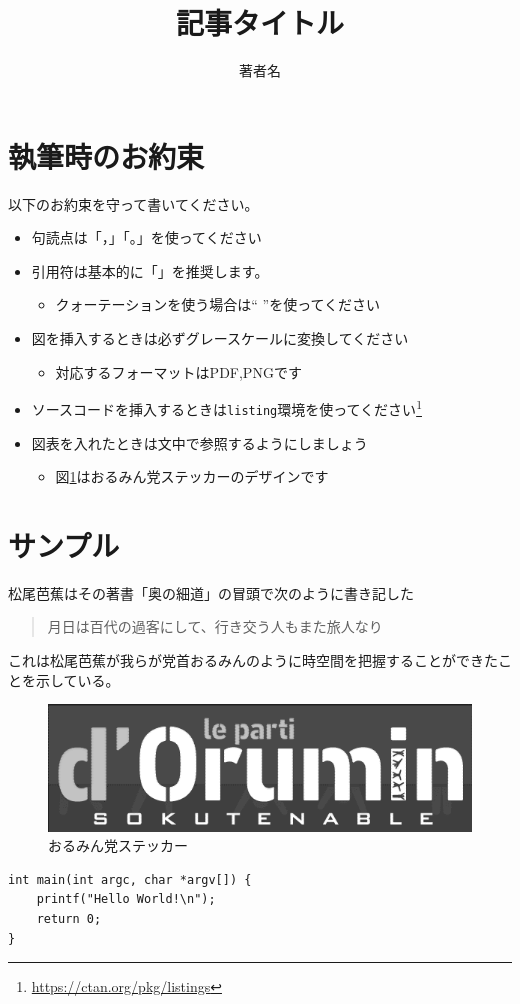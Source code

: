 \documentclass[b5j,papersize,twocolumn]{ltjsarticle}
\title{記事タイトル}
\author{著者名}
\date{}
\begin{document}
\pagestyle{empty}
\maketitle

\section{執筆時のお約束}
以下のお約束を守って書いてください。
\begin{itemize}
	\item 句読点は「，」「。」を使ってください
	\item 引用符は基本的に「」を推奨します。
	\begin{itemize}
		\item クォーテーションを使う場合は`` ''を使ってください
	\end{itemize}
	\item 図を挿入するときは必ずグレースケールに変換してください
	\begin{itemize}
		\item 対応するフォーマットはPDF,PNGです
	\end{itemize}
	\item ソースコードを挿入するときは\verb|listing|環境を使ってください\footnote{\url{https://ctan.org/pkg/listings}}
	\item 図表を入れたときは文中で参照するようにしましょう
	\begin{itemize}
		\item 図\ref{img:sample}はおるみん党ステッカーのデザインです
	\end{itemize}
\end{itemize}
\section{サンプル}
松尾芭蕉はその著書「奥の細道」の冒頭で次のように書き記した

\begin{quote}
月日は百代の過客にして、行き交う人もまた旅人なり
\end{quote}

これは松尾芭蕉が我らが党首おるみんのように時空間を把握することができたことを示している。
\begin{figure}[tb]
	\centering
	\includegraphics[width=0.8\linewidth]{images/oruminparty_sticker.png}
	\caption{おるみん党ステッカー}
	\label{img:sample}
\end{figure}

\begin{lstlisting}
int main(int argc, char *argv[]) {
	printf("Hello World!\n");
	return 0;
}
\end{lstlisting}
\end{document}
